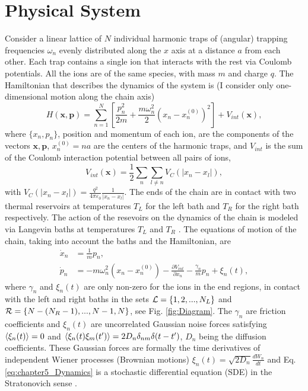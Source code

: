 \section{Physical System\label{sec:chapter5_PhysicalSystem}}
%
%
%
%
Consider a linear lattice of $N$ individual harmonic traps of (angular) trapping frequencies  $\omega_n$ evenly distributed along the $x$ axis at a distance $a$ from each other. Each trap contains a single ion that interacts with the rest via Coulomb potentials. All the ions are of the same species, with mass $m$ and charge $q$. The Hamiltonian that describes the dynamics of the system is (I consider only one-dimensional motion along the chain axis)
%
\begin{equation}
    H(\bm{x},\bm{p}) = \sum_{n=1}^N \left[\frac{p_n^2}{2m}  + \frac{m\omega_n^2}{2} (x_n - x_n^{(0)})^2\right] + V_{int}(\bm{x}),
    \label{eq:chapter5_ChainHamiltonian}
\end{equation}
%
where $\{x_n,p_n\}$, position and momentum of each ion, are the components of  the vectors
$\bm{x},\bm{p}$, $x_n^{(0)} = n  a$ are the centers of the harmonic traps, and $V_{int}$ is the sum of the Coulomb interaction potential between all  pairs of ions,
%
\begin{equation}
    V_{int}(\bm{x}) = \frac{1}{2}\sum_n \sum_{l\neq n} V_{C}(\left|x_n-x_l\right|),
    \label{eq:chapter5_InteractionHamiltonian}
\end{equation}
%
with $V_{C}(\left|x_n-x_l\right|) = \frac{q^2}{4\pi\varepsilon_0}\frac{1}{\left|x_n-x_l\right|}$. The ends of the chain are in contact with two thermal reservoirs at temperatures $T_L$ for the left bath and $T_R$ for the right bath respectively. The action of the resevoirs on the dynamics of the chain is modeled via Langevin baths at temperatures $T_L$ and $T_R$ \cite{Lepri2003,Dhar2018}. The equations of motion of the chain, taking into account the baths and the Hamiltonian, are
%
\begin{equation}
    \begin{split}
        \dot{x}_n &= \frac{1}{m}p_n, \\
        \dot{p}_n &= - m\omega_n^2 (x_n-x_n^{(0)}) - \frac{\partial V_{int}}{\partial x_n} - \frac{\gamma_n}{m}p_n + \xi_n(t),
    \end{split}
    \label{eq:chapter5_Dynamics}
\end{equation}
%
where $\gamma_n$ and $\xi_n(t)$ are only non-zero for the ions in the end regions, in contact with the left and right baths in the sets ${\cal L} = \left\{1,2,...,N_L\right\}$ and \linebreak ${\cal R} = \left\{N-(N_R-1),...,N-1,N\right\}$,  see Fig. \ref{fig:Diagram}. The $\gamma_n$ are friction coefficients and $\xi_n(t)$ are uncorrelated Gaussian noise forces satisfying $\expval{ \xi_n(t)} = 0$ and $\expval{ \xi_n(t)\xi_m(t') } = 2 D_n \delta_{nm}\delta(t-t')$, $D_n$ being the diffusion coefficients. These Gaussian forces are formally the time derivatives of independent Wiener processes (Brownian motions)   $\xi_n(t) = \sqrt{2D_n}\frac{dW_n}{dt}$ \cite{Toral2014,Ruiz2014} and Eq. \eqref{eq:chapter5_Dynamics} is a stochastic differential equation (SDE) in the Stratonovich sense \cite{Toral2014}.

